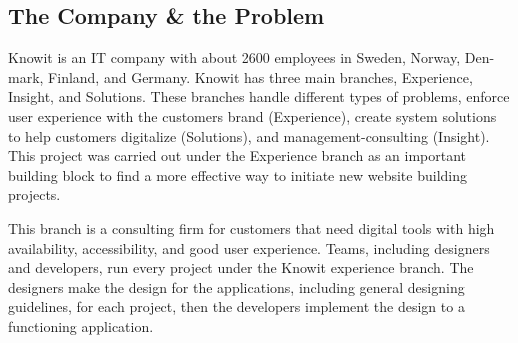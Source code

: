 

\subsection{The Company \& the Problem}




Knowit is an IT company with about 2600 employees in Sweden, Norway, Den- mark, Finland, and Germany. Knowit has three main branches, Experience, Insight, and Solutions. These branches handle different types of problems, enforce user experience with the customers brand (Experience), create system solutions to help customers digitalize (Solutions), and management-consulting (Insight). This project was carried out under the Experience branch as an important building block to find a more effective way to initiate new website building projects. 

This branch is a consulting firm for customers that need digital tools with high availability, accessibility, and good user experience. Teams, including designers and developers, run every project under the Knowit experience branch. The designers make the design for the applications, including general designing guidelines, for each project, then the developers implement the design to a functioning application. 

